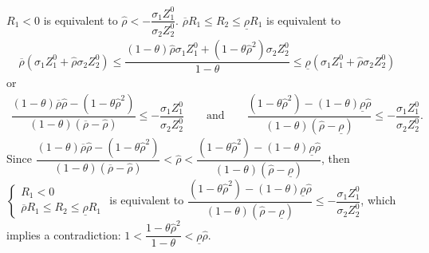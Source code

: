 \documentclass[10pt]{article}
\begin{document}
$ R_1 < 0 $ is equivalent to $ {\hat \rho} < - \dfrac{\sigma_1 Z_1^0}{\sigma_2 Z_2^0} $.
$ \overline{\rho} R_1 \leqslant R_2 \leqslant \underline{\rho} R_1 $ is equivalent to 
\begin{eqnarray*}
\overline{\rho} (\sigma_1 Z_1^0 + {\hat \rho} \sigma_2 Z_2^0) \leqslant \dfrac{(1 - \theta) {\hat \rho} \sigma_1 Z_1^0 + (1 - \theta {\hat \rho}^2) \sigma_2 Z_2^0}{1 - \theta} \leqslant \underline{\rho} (\sigma_1 Z_1^0 + {\hat \rho} \sigma_2 Z_2^0)
\end{eqnarray*}
or
\begin{eqnarray*}
\dfrac{(1 - \theta) \overline{\rho} {\hat \rho} - (1 - \theta {\hat \rho}^2)}{(1 - \theta) (\overline{\rho} - {\hat \rho})} \leqslant - \dfrac{\sigma_1 Z_1^0}{\sigma_2 Z_2^0} \qquad \text{and} \qquad \dfrac{(1 - \theta {\hat \rho}^2) - (1 - \theta) \underline{\rho} {\hat \rho}}{(1 - \theta) ({\hat \rho} - \underline{\rho})} \leqslant - \dfrac{\sigma_1 Z_1^0}{\sigma_2 Z_2^0}.
\end{eqnarray*}
Since $ \dfrac{(1 - \theta) \overline{\rho} {\hat \rho} - (1 - \theta {\hat \rho}^2)}{(1 - \theta) (\overline{\rho} - {\hat \rho})} < {\hat \rho} < \dfrac{(1 - \theta {\hat \rho}^2) - (1 - \theta) \underline{\rho} {\hat \rho}}{(1 - \theta) ({\hat \rho} - \underline{\rho})} $, then $ \left\{ \begin{matrix} R_1 < 0 \\ \overline{\rho} R_1 \leqslant R_2 \leqslant \underline{\rho} R_1 \end{matrix} \right. $ is equivalent to $ \dfrac{(1 - \theta {\hat \rho}^2) - (1 - \theta) \underline{\rho} {\hat \rho}}{(1 - \theta) ({\hat \rho} - \underline{\rho})} \leqslant - \dfrac{\sigma_1 Z_1^0}{\sigma_2 Z_2^0} $, which implies a contradiction: $ 1 < \dfrac{1 - \theta {\hat \rho}^2}{1 - \theta} < \underline{\rho} {\hat \rho} $.
\end{document}
